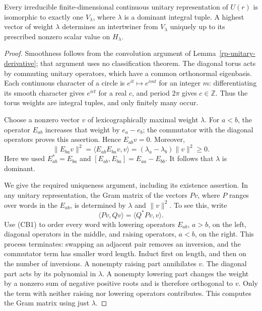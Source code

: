\begin{lemma}\label{cb-highest-classification}
Every irreducible finite-dimensional continuous unitary
representation of $U(r)$ is isomorphic to exactly one $V_\lambda$,
where $\lambda$ is a dominant integral tuple.  A highest vector
of weight $\lambda$ determines an intertwiner from $V_\lambda$
uniquely up to its prescribed nonzero scalar value on $H_\lambda$.
\end{lemma}
\begin{proof}
Smoothness follows from the convolution argument of
Lemma~\ref{rp-unitary-derivative}; that argument uses no
classification theorem.  The diagonal torus acts by commuting
unitary operators, which have a common orthonormal eigenbasis.
Each continuous character of a circle is $e^{it}\mapsto e^{imt}$
for an integer $m$: differentiating its smooth character gives
$e^{ict}$ for a real $c$, and period $2\pi$ gives $c\in\mathbb Z$.
Thus the torus weights are integral tuples, and only finitely
many occur.

Choose a nonzero vector $v$ of lexicographically maximal weight
$\lambda$.  For $a<b$, the operator $E_{ab}$ increases that
weight by $e_a-e_b$; the commutator with the diagonal operators
proves this assertion.  Hence $E_{ab}v=0$.  Moreover,
\[
 \|E_{ba}v\|^2
   =\langle E_{ab}E_{ba}v,v\rangle
   =(\lambda_a-\lambda_b)\|v\|^2\ge0.
\]
Here we used $E_{ab}^*=E_{ba}$ and
$[E_{ab},E_{ba}]=E_{aa}-E_{bb}$.
It follows that $\lambda$ is dominant.

We give the required uniqueness argument, including its
existence assertion.  In any unitary representation, the
Gram matrix of the vectors $Pv$, where $P$ ranges over words
in the $E_{ab}$, is determined by $\lambda$ and $\|v\|^2$.
To see this, write
\[
                    \langle Pv,Qv\rangle
                         =\langle Q^*Pv,v\rangle.
\]
Use (CB1) to order every word with lowering operators
$E_{ab}$, $a>b$, on the left, diagonal operators in the
middle, and raising operators, $a<b$, on the right.
This process terminates: swapping an adjacent pair removes
an inversion, and the commutator term has smaller word length.
Induct first on length, and then on the number of inversions.
A nonempty raising part annihilates $v$.  The diagonal part
acts by its polynomial in $\lambda$.  A nonempty lowering
part changes the weight by a nonzero sum of negative positive
roots and is therefore orthogonal to $v$.  Only the term
with neither raising nor lowering operators contributes.
This computes the Gram matrix using just $\lambda$.


\end{proof}
